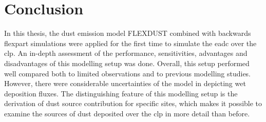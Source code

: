 \label{chap:conclusion}
\section{Conclusion}

In this thesis, the dust emission model FLEXDUST combined with backwards \acrshort{flexpart} simulations were applied for the first time to simulate the \acrshort{eadc} over the \acrshort{clp}.
An in-depth assessment of the performance, sensitivities, advantages and disadvantages of this modelling setup was done. 
Overall, this setup performed well compared both to limited observations and to previous modelling studies.
However, there were considerable uncertainties of the model in depicting wet deposition fluxes.
The distinguishing feature of this modelling setup is the derivation of dust source contribution for specific sites, which makes it possible to examine the sources of dust deposited over the \acrshort{clp} in more detail than before.    

